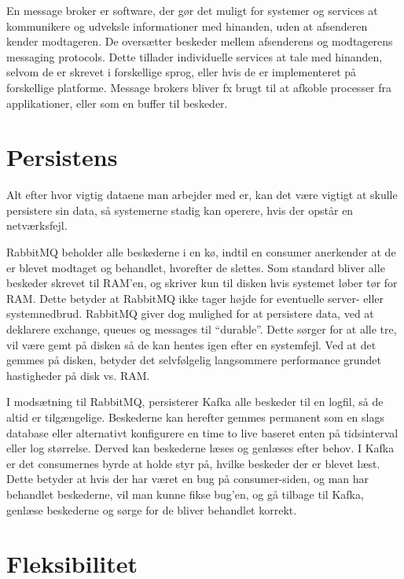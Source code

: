 \documentclass[
]{article}
\begin{document}
En message broker er software, der gør det muligt for systemer og
services at kommunikere og udveksle informationer med hinanden, uden at
afsenderen kender modtageren. De oversætter beskeder mellem afsenderens
og modtagerens messaging protocols. Dette tillader individuelle services
at tale med hinanden, selvom de er skrevet i forskellige sprog, eller
hvis de er implementeret på forskellige platforme. Message brokers
bliver fx brugt til at afkoble processer fra applikationer, eller som en
buffer til beskeder.\cite{message-brokers}

\hypertarget{persistens}{%
\section{Persistens}\label{persistens}}

Alt efter hvor vigtig dataene man arbejder med er, kan det være vigtigt
at skulle persistere sin data, så systemerne stadig kan operere, hvis
der opstår en netværksfejl.


RabbitMQ beholder alle beskederne i en kø, indtil en consumer anerkender
at de er blevet modtaget og behandlet, hvorefter de slettes. Som
standard bliver alle beskeder skrevet til RAM'en, og skriver kun til
disken hvis systemet løber tør for RAM. Dette betyder at RabbitMQ
ikke tager højde for eventuelle server- eller systemnedbrud.\cite{rabbit-persistence} RabbitMQ giver dog mulighed for at persistere data, ved at deklarere exchange,
queues og messages til ``durable''.\cite{rabbit-durable} Dette sørger for at alle tre, vil
være gemt på disken så de kan hentes igen efter en systemfejl. Ved at
det gemmes på disken, betyder det selvfølgelig langsommere performance
grundet hastigheder på disk vs. RAM.

I modsætning til RabbitMQ, persisterer Kafka alle beskeder til en
logfil, så de altid er tilgængelige. Beskederne kan herefter gemmes
permanent som en slags database eller alternativt konfigurere en time to live
baseret enten på tidsinterval eller log størrelse. Derved kan beskederne
læses og genlæses efter behov. I Kafka er det consumernes byrde at holde
styr på, hvilke beskeder der er blevet læst. Dette betyder at hvis der
har været en bug på consumer-siden, og man har behandlet beskederne, vil
man kunne fikse bug'en, og gå tilbage til Kafka, genlæse beskederne og
sørge for de bliver behandlet korrekt.

\hypertarget{fleksibilitet}{%
\section{Fleksibilitet}\label{fleksibilitet}}
\end{document}
